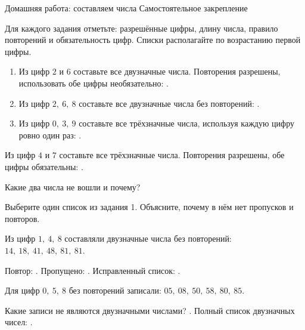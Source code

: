 \worksheettitle
  {Домашняя работа: составляем числа}
  { Самостоятельное закрепление}

\studentnameblock

\begin{notebox}
  Для каждого задания отметьте: разрешённые цифры, длину числа, правило
  повторений и обязательность цифр. Списки располагайте по возрастанию первой
  цифры.
\end{notebox}

\begin{practicebox}
  \begin{enumerate}[label=\textbf{\arabic*.}]
    \item Из цифр \(2\) и \(6\) составьте все двузначные числа. Повторения
      разрешены, использовать обе цифры необязательно:
      \answerblank[72mm].
    \item Из цифр \(2,\ 6,\ 8\) составьте все двузначные числа без повторений:
      \answerblank[84mm].
    \item Из цифр \(0,\ 3,\ 9\) составьте все трёхзначные числа, используя
      каждую цифру ровно один раз:
      \answerblank[84mm].
  \end{enumerate}
\end{practicebox}

\begin{practicebox}
  Из цифр \(4\) и \(7\) составьте все трёхзначные числа. Повторения разрешены,
  обе цифры обязательны:
  \answerblank[98mm].

  Какие два числа не вошли и почему?
\end{practicebox}

\begin{practicebox}
  Выберите один список из задания 1. Объясните, почему в нём нет пропусков и
  повторов.
\end{practicebox}

\newpage
\begin{warningbox}
  Из цифр \(1,\ 4,\ 8\) составляли двузначные числа без повторений:
  \(14,\ 18,\ 41,\ 48,\ 81,\ 81\).

  Повтор: \answerblank[15mm]. Пропущено: \answerblank[15mm].
  Исправленный список: \answerblank[82mm].
\end{warningbox}

\begin{warningbox}
  Для цифр \(0,\ 5,\ 8\) без повторений записали:
  \(05,\ 08,\ 50,\ 58,\ 80,\ 85\).

  Какие записи не являются двузначными числами? \answerblank[30mm].
  Полный список двузначных чисел: \answerblank[70mm].
\end{warningbox}

